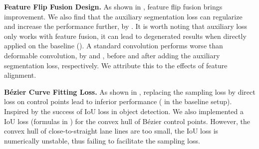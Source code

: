 \documentclass[10pt,twocolumn,letterpaper]{article}
\begin{document}
\begin{table}[ht]
    \centering
    \caption{Ablations. \textbf{CP}: Control point loss \cite{liu2020abcnet}. \textbf{SP}: The proposed sampling loss. \textbf{Flip}: The feature flip fusion module. \textbf{Deform}: Employ the deformable convolution in feature flip fusion. \textbf{Seg}: Auxiliary segmentation loss.}
    \label{tab:abl}
    \vspace{-4mm}
\end{table}



\noindent \textbf{Feature Flip Fusion Design.} As shown in , feature flip fusion brings  improvement. We also find that the auxiliary segmentation loss can regularize and increase the performance further, by . It is worth noting that auxiliary loss only works with feature fusion, it can lead to degenerated results when directly applied on the baseline (). A standard  convolution performs worse than deformable convolution, by  and , before and after adding the auxiliary segmentation loss, respectively. We attribute this to the effects of feature alignment.



\noindent \textbf{Bézier Curve Fitting Loss.} As shown in , replacing the sampling loss by direct loss on control points lead to inferior performance ( in the baseline setup). Inspired by the success of IoU loss in object detection. We also implemented a IoU loss (formulas in ) for the convex hull of Bézier control points. However, the convex hull of close-to-straight lane lines are too small, the IoU loss is numerically unstable, thus failing to facilitate the sampling loss.
\end{document}
